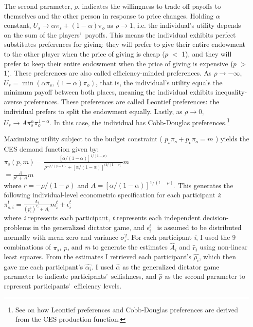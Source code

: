 \documentclass[12pt]{article}
\begin{document}
The second parameter, \(\rho\), indicates the willingness to trade off payoffs to themselves and the other person in response to price changes. Holding \(\alpha\) constant, \(U_{s} \rightarrow \alpha\pi_{s} + (1-\alpha)\pi_{o}\) as \(\rho \rightarrow 1\),  i.e. the individual\rq s utility depends on the sum of the players\rq \ payoffs. This means the individual exhibits perfect substitutes preferences for giving: they will prefer to give their entire endowment to the other player when the price of giving is cheap (\(p\) $<$ 1), and they will prefer to keep their entire endowment when the price of giving is expensive (\(p\) $>$ 1). These preferences are also called efficiency-minded preferences. As \(\rho \rightarrow -\infty\), \(U_{s} = \min(\alpha\pi_{s}, (1-\alpha)\pi_{o})\), that is, the individual\rq s utility equals the minimum payoff between both places, meaning the individual exhibits inequality-averse preferences. These preferences are called Leontief preferences: the individual prefers to split the endowment equally. Lastly, as \(\rho \rightarrow 0\), \(U_{s} \rightarrow A\pi_{s}^{\alpha}\pi_{o}^{1-\alpha}\). In this case, the individual has Cobb-Douglas preferences.\footnote{See \cite{arrow_1961} on how Leontief preferences and Cobb-Douglas preferences are derived from the CES production function.}

Maximizing utility subject to the budget constraint ( \(p_{s}\pi_{s} + p_{o}\pi_{o}=m\) ) yields the CES demand function given by: \\
 

\(\pi_{s}(p,m)=\frac{[\alpha/(1-\alpha)]^{1/(1-\rho)}}{\rho^{-\rho/(\rho-1)}+[\alpha/(1-\alpha)]^{(1/(1-\rho)}}m\) \\

\hspace{14.5mm} \(= \frac{A}{p^{r}+A}m\) \\
 
 \noindent
where \(r=-\rho / (1-\rho) \) and \(A=[\alpha / (1-\alpha)]^{1/(1-\rho)} \). This generates the following individual-level econometric specification for each participant \textit{i}: \\
 
\( \pi^{t}_{s,i} = \frac{A_{i}}{(p^{t}_{i})^{r_{i}} + A_{i}}m^{t}_{i} + \epsilon^{t}_{i}\) \\
 
\noindent
where \textit{i} represents each participant, \textit{t} represents each independent decision-problems in the generalized dictator game, and \( \epsilon^{t}_{i} \) \ is assumed to be distributed normally with mean zero and variance \(\sigma^{2}_{i}\). For each participant \textit{i}, I used the 9 combinations of \(\pi_{s}\), \(p\), and \textit{m} to generate the estimates  \( \hat{A}_{i} \) and \( \hat{r}_{i} \) using non-linear least squares. From the estimates I retrieved each participant\rq s \( \hat{\rho_{i}}\), which then gave me each participant\rq s \( \hat{\alpha_{i}} \). I used \(\hat{\alpha}\) as the generalized dictator game parameter to indicate participants\rq \ selfishness, and \(\hat{\rho}\) as the second parameter to represent participants\rq \ efficiency levels.
\end{document}
